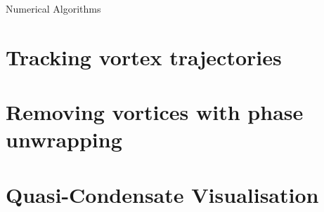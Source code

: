 \begin{chapter}{\label{cha:numerics}Numerical Algorithms}
\section{\label{section:vortextracking} Tracking vortex trajectories}
\section{\label{section:vortexremoval} Removing vortices with phase unwrapping}

\section{\label{section:quasi-condensate} Quasi-Condensate Visualisation}
	

\end{chapter}
